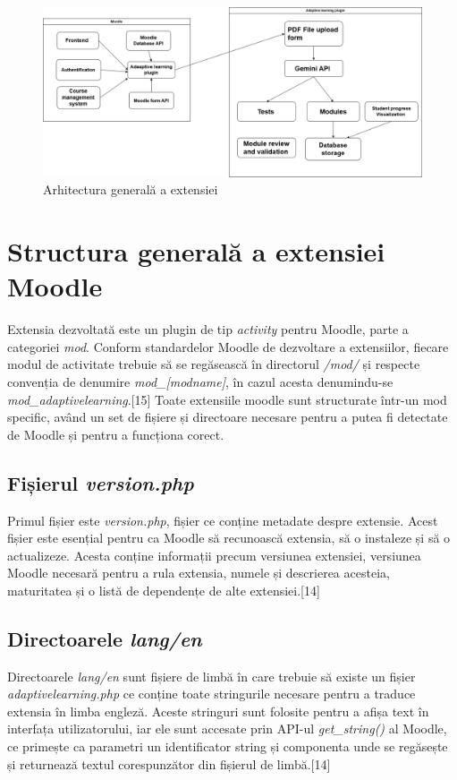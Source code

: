 \begin{figure}[ht]
    \centering
    \includegraphics[width=1\textwidth]{images/LicentaArchitectureDiagram.png}
    \caption{Arhitectura generală a extensiei}
    \label{fig:arch_diagram}
\end{figure}

\section{Structura generală a extensiei Moodle}

Extensia dezvoltată este un plugin de tip \textit{activity} pentru Moodle, parte a categoriei \textit{mod}. Conform standardelor Moodle de dezvoltare a extensiilor, fiecare modul de activitate 
trebuie să se regăsească în directorul \textit{/mod/} și respecte convenția de denumire \textit{mod\_[modname]}, în cazul acesta denumindu-se \textit{mod\_adaptivelearning}.[15] Toate extensiile 
moodle sunt structurate într-un mod specific, având un set de fișiere și directoare necesare pentru a putea fi detectate de Moodle și pentru a funcționa corect. 

\subsection{Fișierul \textit{version.php}}
Primul fișier este 
\textit{version.php}, fișier ce conține metadate despre extensie. Acest fișier este esențial pentru ca Moodle să recunoască extensia, să o instaleze și să o actualizeze. Acesta conține 
informații precum versiunea extensiei, versiunea Moodle necesară pentru a rula extensia, numele și descrierea acesteia, maturitatea și o listă de dependențe de alte extensiei.[14] 

\subsection{Directoarele \textit{lang/en}}
Directoarele 
\textit{lang/en} sunt fișiere de limbă în care trebuie să existe un fișier \textit{adaptivelearning.php} ce conține toate stringurile necesare pentru a traduce extensia în limba engleză. 
Aceste stringuri sunt folosite pentru a afișa text în interfața utilizatorului, iar ele sunt accesate prin API-ul \textit{get\_string()} al Moodle, ce primește ca parametri un identificator
string și componenta unde se regăsește și returnează textul corespunzător din fișierul de limbă.[14]

